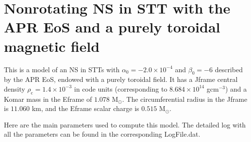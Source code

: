 \documentclass[letterpaper,10pt,english]{sphinxmanual}
\begin{document}
\section{Non\sphinxhyphen{}rotating NS in STT with the APR EoS and a purely toroidal magnetic field}
\label{\detokenize{examples_stt:non-rotating-ns-in-stt-with-the-apr-eos-and-a-purely-toroidal-magnetic-field}}
\sphinxAtStartPar
This is a model of an NS in STTs with \(\alpha _0 = -2.0\times 10^{-4}\) and \(\beta _0 = -6\) described by the APR EoS, endowed with a purely toroidal field. It has a J\sphinxhyphen{}frame central density \(\rho _\mathrm{c}=1.4\times 10^{-3}\) in code units (corresponding to \(8.684\times 10^{14}\) gcm\(^{-3}\)) and a Komar mass in the E\sphinxhyphen{}frame of \(1.078\) M\( _\odot\). The circumferential radius in the J\sphinxhyphen{}frame is \(11.060\) km, and the E\sphinxhyphen{}frame scalar charge is \(0.515\) M\( _\odot\).

\sphinxAtStartPar
Here are the main parameters used to compute this model. The detailed log with all the parameters can be found in the corresponding LogFile.dat.

\begin{sphinxVerbatim}[commandchars=\\\{\}]
                    
                 
              
              
              
\end{sphinxVerbatim}
\end{document}
